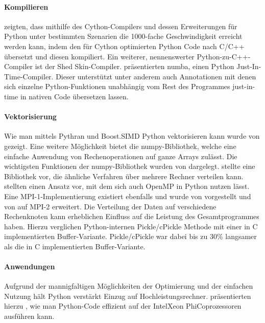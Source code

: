 \paragraph{Kompilieren}

\citeauthor{BBC+11} zeigten, dass mithilfe des Cython-Compilers und dessen Erweiterungen für Python unter bestimmten Szenarien die 1000-fache Geschwindigkeit erreicht werden kann, indem den für Cython optimierten Python Code nach C/C++ übersetzt und diesen kompiliert. \cite{BBC+11} Ein weiterer, nennenswerter Python-zu-C++-Compiler ist der Shed Skin-Compiler. \cite{Mar09} \citeauthor{LPS15} präsentierten \citeyear{LPS15} numba, einen Python Just-In-Time-Compiler. \cite{LPS15} Dieser unterstützt unter anderem auch Annotationen mit denen sich einzelne Python-Funktionen unabhängig vom Rest des Programmes just-in-time in nativen Code übersetzen lassen. 

\paragraph{Vektorisierung}

Wie man mittels Pythran und Boost.SIMD Python vektorisieren kann wurde \citeyear{GFB14} von \citeauthor{GFB14} gezeigt. \cite{GFB14} Eine weitere Möglichkeit bietet die numpy-Bibliothek, welche eine einfache Anwendung von Rechenoperationen auf ganze Arrays zulässt. Die wichtigsten Funktionen der numpy-Bibliothek wurden von \citeauthor{VCV11} dargelegt. \citeauthor{Dai09} stellte \citeyear{Dai09} eine Bibliothek vor, die ähnliche Verfahren über mehrere Rechner verteilen kann. \cite{Dai09}
\citeauthor{GBA13} stellten \citeyear{GBA13} einen Ansatz vor, mit dem sich auch OpenMP in Python nutzen lässt. \cite{GBA13} Eine MPI-1-Implementierung existiert ebenfalls und wurde \citeyear{DPS05} von \cite{DPS05} vorgestellt und \citeyear{DPS+08} von \citeauthor{DPS+08} auf MPI-2 erweitert.
Die Verteilung der Daten auf verschiedene Rechenknoten kann erheblichen Einfluss auf die Leistung des Gesamtprogrammes haben. Hierzu verglichen \citeauthor{DPK+11} Python-internen Pickle/cPickle Methode mit einer in C implementierten Buffer-Variante. \cite{DPK+11} Pickle/cPickle war dabei bis zu 30\% langsamer als die in C implementierten Buffer-Variante. 

\paragraph{Anwendungen}

Aufgrund der mannigfaltigen Möglichkeiten der Optimierung und der einfachen Nutzung hält Python verstärkt Einzug auf Hochleistungsrechner. \citeauthor{KE14} präsentierten hierzu \citeyear{KE14}, wie man Python-Code effizient auf der Intel\textregistered Xeon Phi\texttrademark Coprozessoren ausführen kann. \cite{KE14}

